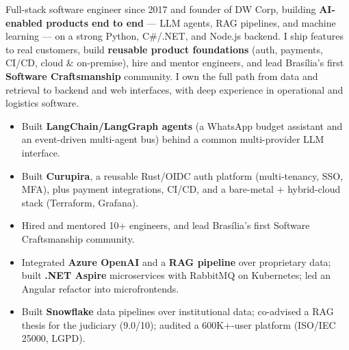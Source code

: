 \documentclass[10pt,a4paper]{altacv}
\begin{document}

\makecvheader


Full-stack software engineer since 2017 and founder of DW Corp, building \textbf{AI-enabled products end to end} — LLM agents, RAG pipelines, and machine learning — on a strong Python, C\#/.NET, and Node.js backend. I ship features to real customers, build \textbf{reusable product foundations} (auth, payments, CI/CD, cloud \& on-premise), hire and mentor engineers, and lead Brasília's first \textbf{Software Craftsmanship} community. I own the full path from data and retrieval to backend and web interfaces, with deep experience in operational and logistics software.


\begin{itemize}
\item Built \textbf{LangChain/LangGraph agents} (a WhatsApp budget assistant and an event-driven multi-agent bus) behind a common multi-provider LLM interface.
\item Built \textbf{Curupira}, a reusable Rust/OIDC auth platform (multi-tenancy, SSO, MFA), plus payment integrations, CI/CD, and a bare-metal + hybrid-cloud stack (Terraform, Grafana).
\item Hired and mentored 10+ engineers, and lead Brasília's first Software Craftsmanship community.
\end{itemize}
\divider

\begin{itemize}
\item Integrated \textbf{Azure OpenAI} and a \textbf{RAG pipeline} over proprietary data; built \textbf{.NET Aspire} microservices with RabbitMQ on Kubernetes; led an Angular refactor into microfrontends.
\end{itemize}
\divider

\begin{itemize}
\item Built \textbf{Snowflake} data pipelines over institutional data; co-advised a RAG thesis for the judiciary (9.0/10); audited a 600K+-user platform (ISO/IEC 25000, LGPD).
\end{itemize}
\divider
\end{document}
